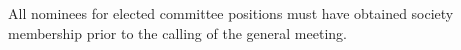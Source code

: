 \begin{clause}
    All nominees for elected committee positions must have obtained society membership prior to the calling of the general meeting.
\end{clause}